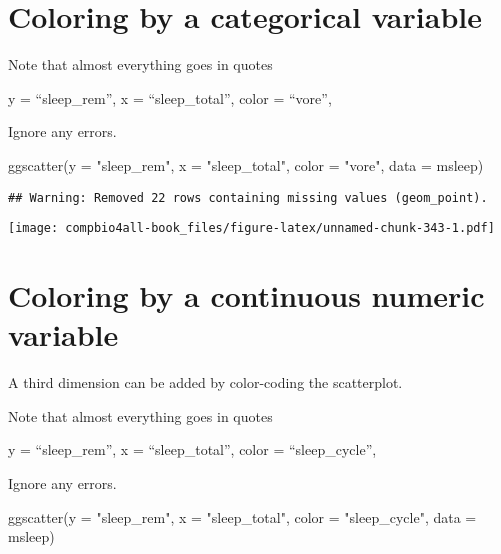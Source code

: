 \documentclass[
]{book}
\newenvironment{Shaded}{\begin{snugshade}}{\end{snugshade}}
\newcommand{\AttributeTok}[1]{\textcolor[rgb]{0.77,0.63,0.00}{#1}}
\newcommand{\FunctionTok}[1]{\textcolor[rgb]{0.00,0.00,0.00}{#1}}
\newcommand{\NormalTok}[1]{#1}
\newcommand{\StringTok}[1]{\textcolor[rgb]{0.31,0.60,0.02}{#1}}
\begin{document}
\hypertarget{coloring-by-a-categorical-variable}{%
\section{Coloring by a categorical variable}\label{coloring-by-a-categorical-variable}}

Note that almost everything goes in quotes

y = ``sleep\_rem'',
x = ``sleep\_total'',
color = ``vore'',

Ignore any errors.

\begin{Shaded}
\begin{Highlighting}[]
\FunctionTok{ggscatter}\NormalTok{(}\AttributeTok{y =} \StringTok{"sleep\_rem"}\NormalTok{,}
          \AttributeTok{x =} \StringTok{"sleep\_total"}\NormalTok{,}
          \AttributeTok{color =} \StringTok{"vore"}\NormalTok{,}
          \AttributeTok{data =}\NormalTok{ msleep)}
\end{Highlighting}
\end{Shaded}

\begin{verbatim}
## Warning: Removed 22 rows containing missing values (geom_point).
\end{verbatim}

\texttt{[image: compbio4all-book\_files/figure-latex/unnamed-chunk-343-1.pdf]}

\hypertarget{coloring-by-a-continuous-numeric-variable}{%
\section{Coloring by a continuous numeric variable}\label{coloring-by-a-continuous-numeric-variable}}

A third dimension can be added by color-coding the scatterplot.

Note that almost everything goes in quotes

y = ``sleep\_rem'',
x = ``sleep\_total'',
color = ``sleep\_cycle'',

Ignore any errors.

\begin{Shaded}
\begin{Highlighting}[]
\FunctionTok{ggscatter}\NormalTok{(}\AttributeTok{y =} \StringTok{"sleep\_rem"}\NormalTok{,}
          \AttributeTok{x =} \StringTok{"sleep\_total"}\NormalTok{,}
          \AttributeTok{color =} \StringTok{"sleep\_cycle"}\NormalTok{,}
          \AttributeTok{data =}\NormalTok{ msleep)}
\end{Highlighting}
\end{Shaded}
\end{document}
